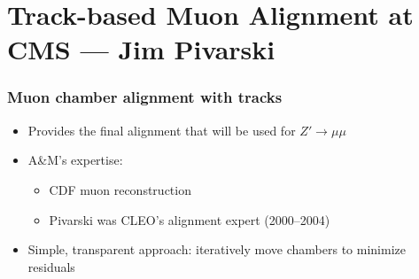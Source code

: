\documentclass[compress]{beamer}
\begin{document}
\section*{Track-based Muon Alignment at CMS --- Jim Pivarski}

\begin{frame}
\frametitle{Muon chamber alignment with tracks}
\begin{itemize}
  \item Provides the final alignment that will be used for $Z'\to\mu\mu$
  \item A\&M's expertise:
  \begin{itemize}
    \item CDF muon reconstruction
    \item Pivarski was CLEO's alignment expert (2000--2004)
  \end{itemize}
  \item<2> Simple, transparent approach: iteratively move chambers to minimize residuals
\end{itemize}


\end{frame}
\end{document}
